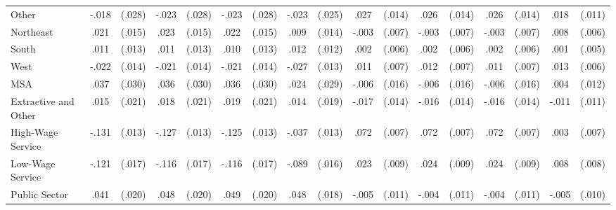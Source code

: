 \begin{table}[htbp]
\begin{tabular}{l*{8}{cc}}
Other           &    -.018         &   (.028)&    -.023         &   (.028)&    -.023         &   (.028)&    -.023         &   (.025)&     .027\sym{+}  &   (.014)&     .026\sym{+}  &   (.014)&     .026\sym{+}  &   (.014)&     .018         &   (.011)\\
Northeast       &     .021         &   (.015)&     .023         &   (.015)&     .022         &   (.015)&     .009         &   (.014)&    -.003         &   (.007)&    -.003         &   (.007)&    -.003         &   (.007)&     .008         &   (.006)\\
South           &     .011         &   (.013)&     .011         &   (.013)&     .010         &   (.013)&     .012         &   (.012)&     .002         &   (.006)&     .002         &   (.006)&     .002         &   (.006)&     .001         &   (.005)\\
West            &    -.022         &   (.014)&    -.021         &   (.014)&    -.021         &   (.014)&    -.027\sym{*}  &   (.013)&     .011\sym{+}  &   (.007)&     .012\sym{+}  &   (.007)&     .011\sym{+}  &   (.007)&     .013\sym{*}  &   (.006)\\
MSA             &     .037         &   (.030)&     .036         &   (.030)&     .036         &   (.030)&     .024         &   (.029)&    -.006         &   (.016)&    -.006         &   (.016)&    -.006         &   (.016)&     .004         &   (.012)\\
Extractive and Other&     .015         &   (.021)&     .018         &   (.021)&     .019         &   (.021)&     .014         &   (.019)&    -.017         &   (.014)&    -.016         &   (.014)&    -.016         &   (.014)&    -.011         &   (.011)\\
High-Wage Service&    -.131\sym{***}&   (.013)&    -.127\sym{***}&   (.013)&    -.125\sym{***}&   (.013)&    -.037\sym{**} &   (.013)&     .072\sym{***}&   (.007)&     .072\sym{***}&   (.007)&     .072\sym{***}&   (.007)&     .003         &   (.007)\\
Low-Wage Service&    -.121\sym{***}&   (.017)&    -.116\sym{***}&   (.017)&    -.116\sym{***}&   (.017)&    -.089\sym{***}&   (.016)&     .023\sym{**} &   (.009)&     .024\sym{**} &   (.009)&     .024\sym{**} &   (.009)&     .008         &   (.008)\\
Public Sector   &     .041\sym{*}  &   (.020)&     .048\sym{*}  &   (.020)&     .049\sym{*}  &   (.020)&     .048\sym{**} &   (.018)&    -.005         &   (.011)&    -.004         &   (.011)&    -.004         &   (.011)&    -.005         &   (.010)\\

\end{tabular}
\end{table}
